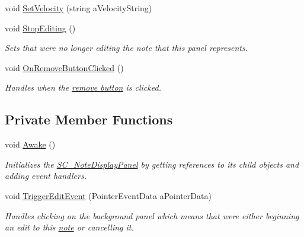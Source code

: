\begin{DoxyCompactItemize}
void \hyperlink{group___s_c___n_d_p_unity_ga8a2fef715606caa884c7b490850fb9b7}{Set\+Velocity} (string a\+Velocity\+String)
\item 
void \hyperlink{group___s_c___n_d_p_unity_ga92d0f078c4efd6c207173a10e31b5065}{Stop\+Editing} ()
\begin{DoxyCompactList}\small\item\em Sets that we\textquotesingle{}re no longer editing the note that this panel represents. \end{DoxyCompactList}\item 
void \hyperlink{group___s_c___n_d_p_handlers_ga0b545f6cd12ce56258842cb1036bceec}{On\+Remove\+Button\+Clicked} ()
\begin{DoxyCompactList}\small\item\em Handles when the \hyperlink{group___s_c___n_d_p_priv_var_gac9af0bdc5b04a52ab9e7c13a0ad01ab7}{remove button} is clicked. \end{DoxyCompactList}\end{DoxyCompactItemize}
\subsection*{Private Member Functions}
\begin{DoxyCompactItemize}
\item 
void \hyperlink{group___s_c___n_d_p_unity_ga131f594d4f9b5887acb0de0a8bb5532a}{Awake} ()
\begin{DoxyCompactList}\small\item\em Initializes the \hyperlink{class_s_c___note_display_panel}{S\+C\+\_\+\+Note\+Display\+Panel} by getting references to its child objects and adding event handlers. \end{DoxyCompactList}\item 
void \hyperlink{group___s_c___n_d_p_handlers_ga7b25bcc6b76ae0894ac6eefde417caf1}{Trigger\+Edit\+Event} (Pointer\+Event\+Data a\+Pointer\+Data)
\begin{DoxyCompactList}\small\item\em Handles clicking on the background panel which means that we\textquotesingle{}re either beginning an edit to this \hyperlink{group___music_structs_struct_music_1_1_combined_note}{note} or cancelling it. \end{DoxyCompactList}\end{DoxyCompactItemize}
